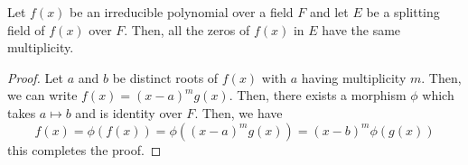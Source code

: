\begin{proposition}
	Let $f(x)$ be an irreducible polynomial over a field $F$ and let $E$ be a splitting field of $f(x)$ over $F$. Then, all the zeros of $f(x)$ in $E$ have the same multiplicity.
\end{proposition}
\begin{proof}
	Let $a$ and $b$ be distinct roots of $f(x)$ with $a$ having multiplicity $m$. Then, we can write $f(x)=(x-a)^mg(x)$. Then, there exists a morphism $\phi$ which takes $a\mapsto b$ and is identity over $F$. Then, we have 
	\begin{equation*}
		f(x) = \phi(f(x)) = \phi((x-a)^mg(x)) = (x-b)^m\phi(g(x))
	\end{equation*}
	this completes the proof.
\end{proof}
